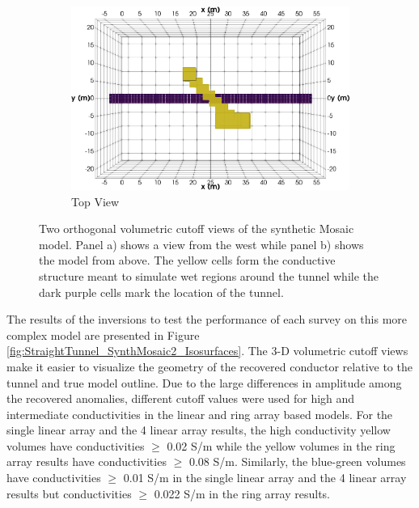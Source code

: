 \documentclass[preprint,authoryear,12pt]{elsarticle}
\begin{document}
\begin{figure}[htp]{}
\begin{center}
\begin{subfigure}{0.54\linewidth}
         \includegraphics[trim=0cm 0cm 0cm 0cm, clip=true,width=\linewidth]{./figures/Fig12b.png}
         \caption{Top View}
         \label{fig:StraightTunnel_SynthMosaic2_TrueMod_Top}
      \end{subfigure}
   \end{center}
\vspace{-0.4cm}
\caption{Two orthogonal volumetric cutoff views of the synthetic Mosaic model. Panel a) shows a view from the west while panel b) shows the model from above. The yellow cells form the conductive structure meant to simulate wet regions around the tunnel while the dark purple cells mark the location of the tunnel.}
\label{fig:StraightTunnel_SynthMosaic2_TrueMod}
\end{figure}


The results of the inversions to test the performance of each survey on this more complex model are presented in Figure \ref{fig:StraightTunnel_SynthMosaic2_Isosurfaces}. The 3-D volumetric cutoff views make it easier to visualize the geometry of the recovered conductor relative to the tunnel and true model outline. Due to the large differences in amplitude among the recovered anomalies, different cutoff values were used for high and intermediate conductivities in the linear and ring array based models. For the single linear array and the 4 linear array results, the high conductivity yellow volumes have conductivities $\geq$ 0.02 S/m while the yellow volumes in the ring array results have conductivities $\geq$ 0.08 S/m. Similarly, the blue-green volumes have conductivities $\geq$ 0.01 S/m in the single linear array and the 4 linear array results but conductivities $\geq$ 0.022 S/m in the ring array results.
\end{document}
